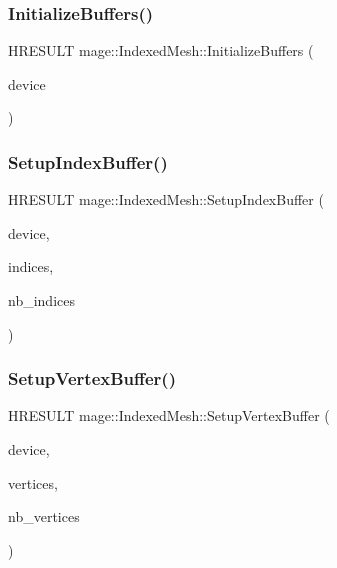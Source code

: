\hypertarget{classmage_1_1_indexed_mesh_a6fb81a1e8f17452de954d836bd2fbbae}{}\label{classmage_1_1_indexed_mesh_a6fb81a1e8f17452de954d836bd2fbbae} 
\subsubsection{\texorpdfstring{Initialize\+Buffers()}{InitializeBuffers()}}
{\footnotesize\ttfamily H\+R\+E\+S\+U\+LT mage\+::\+Indexed\+Mesh\+::\+Initialize\+Buffers (\begin{DoxyParamCaption}\item[{I\+D3\+D11\+Device2 $\ast$}]{device }\end{DoxyParamCaption})\hspace{0.3cm}{\ttfamily [protected]}}

\hypertarget{classmage_1_1_indexed_mesh_af7768d4fed6cbd54b92704a5e3598b78}{}\label{classmage_1_1_indexed_mesh_af7768d4fed6cbd54b92704a5e3598b78} 
\subsubsection{\texorpdfstring{Setup\+Index\+Buffer()}{SetupIndexBuffer()}}
{\footnotesize\ttfamily H\+R\+E\+S\+U\+LT mage\+::\+Indexed\+Mesh\+::\+Setup\+Index\+Buffer (\begin{DoxyParamCaption}\item[{I\+D3\+D11\+Device2 $\ast$}]{device,  }\item[{const uint32\+\_\+t $\ast$}]{indices,  }\item[{size\+\_\+t}]{nb\+\_\+indices }\end{DoxyParamCaption})\hspace{0.3cm}{\ttfamily [protected]}}

\hypertarget{classmage_1_1_indexed_mesh_a5a6107080bbdba1288ffee59cb7523f0}{}\label{classmage_1_1_indexed_mesh_a5a6107080bbdba1288ffee59cb7523f0} 
\subsubsection{\texorpdfstring{Setup\+Vertex\+Buffer()}{SetupVertexBuffer()}}
{\footnotesize\ttfamily H\+R\+E\+S\+U\+LT mage\+::\+Indexed\+Mesh\+::\+Setup\+Vertex\+Buffer (\begin{DoxyParamCaption}\item[{I\+D3\+D11\+Device2 $\ast$}]{device,  }\item[{const \hyperlink{structmage_1_1_vertex}{Vertex} $\ast$}]{vertices,  }\item[{size\+\_\+t}]{nb\+\_\+vertices }\end{DoxyParamCaption})\hspace{0.3cm}{\ttfamily [protected]}}

